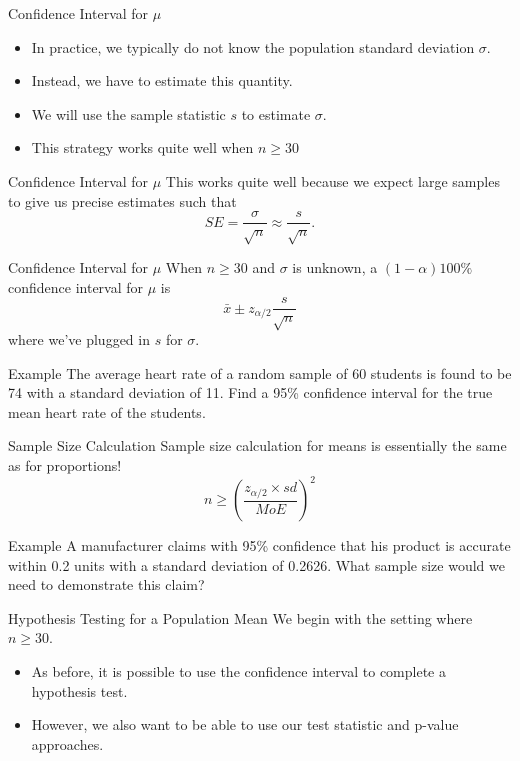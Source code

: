\begin{frame}{Confidence Interval for $\mu$}
    \begin{itemize}
        \item In practice, we typically do not know the population standard deviation $\sigma$.
        \item Instead, we have to estimate this quantity.
        \item We will use the sample statistic $s$ to estimate $\sigma$.
        \item This strategy works quite well when $n \ge 30$
    \end{itemize}
\end{frame}

\begin{frame}{Confidence Interval for $\mu$}
    This works quite well because we expect large samples to give us precise estimates such that
    \[
        SE = \frac{\sigma}{\sqrt{n}} \approx \frac{s}{\sqrt{n}}.
    \]
\end{frame}

\begin{frame}{Confidence Interval for $\mu$}
    When $n \ge 30$ and $\sigma$ is unknown, a $(1-\alpha)100\%$ confidence interval for $\mu$ is
    \[
        \bar{x} \pm z_{\alpha/2}\frac{s}{\sqrt{n}}
    \]
    where we've plugged in $s$ for $\sigma$.
\end{frame}

\begin{frame}{Example}
    The average heart rate of a random sample of 60 students is found to be 74 with a standard deviation of 11. Find a 95\% confidence interval for the true mean heart rate of the students. 
\end{frame}

\begin{frame}{Sample Size Calculation}
    Sample size calculation for means is essentially the same as for proportions!
    \[
        n \ge \left(\frac{z_{\alpha/2} \times sd}{MoE}\right)^2
    \]
\end{frame}

\begin{frame}{Example}
    A manufacturer claims with 95\% confidence that his product is accurate within 0.2 units with a standard deviation of 0.2626. What sample size would we need to demonstrate this claim?
\end{frame}

\begin{frame}{Hypothesis Testing for a Population Mean}
    We begin with the setting where $n\ge 30$. 
    \begin{itemize}
        \item As before, it is possible to use the confidence interval to complete a hypothesis test.
        \item However, we also want to be able to use our test statistic and p-value approaches.
    \end{itemize}
\end{frame}

